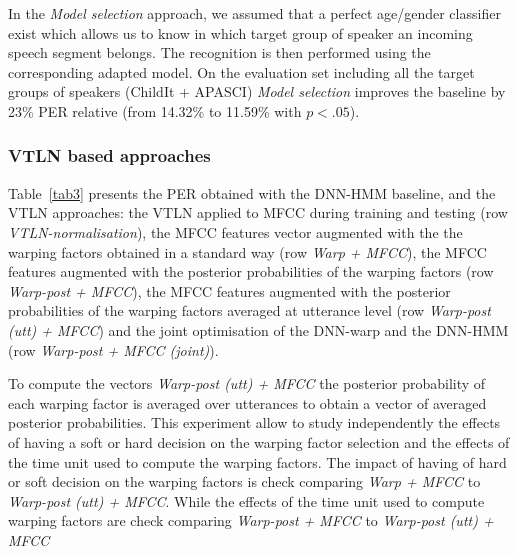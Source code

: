 \documentclass{nle}
\begin{document}
In the {\em Model selection} approach, we assumed that a perfect age/gender classifier exist which allows us to know in which target group of speaker an incoming speech segment belongs. The recognition is then performed using the corresponding adapted model. On the evaluation set including all the target groups of speakers (ChildIt + APASCI) {\em Model selection} improves the baseline by 23\% PER relative (from 14.32\% to 11.59\% with $p<.05$).

\subsubsection{VTLN based approaches}
Table~\ref{tab3}  presents the PER obtained with the DNN-HMM baseline, and the VTLN approaches: the VTLN applied to MFCC during training and testing (row {\em VTLN-normalisation}), the MFCC features vector augmented with the the warping factors obtained in a standard way (row {\em Warp + MFCC}), the MFCC features augmented with the posterior probabilities of the warping factors (row {\em Warp-post + MFCC}), the MFCC features augmented with the posterior probabilities of the warping factors averaged at utterance level (row {\em Warp-post (utt) + MFCC}) and the joint optimisation of the DNN-warp and the DNN-HMM (row {\em Warp-post + MFCC (joint)}). 

To compute the vectors {\em Warp-post (utt) + MFCC} the posterior probability of each warping factor is averaged over utterances to obtain a vector of averaged posterior probabilities. This experiment allow to study independently the effects of having a soft or hard decision on the warping factor selection and the effects of the time unit used to compute the warping factors. The impact of having of hard or soft decision on the warping factors is check comparing {\em Warp + MFCC} to {\em Warp-post (utt) + MFCC}. While the effects of the time unit used to compute warping factors are check comparing {\em Warp-post + MFCC} to {\em Warp-post (utt) + MFCC}
\end{document}
